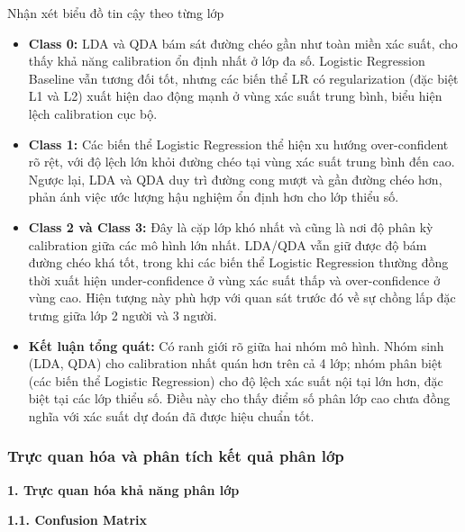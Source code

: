 \begin{warningbox}{Nhận xét biểu đồ tin cậy theo từng lớp}
\begin{itemize}
    \item \textbf{Class 0:} LDA và QDA bám sát đường chéo gần như toàn miền xác suất, cho thấy khả năng calibration ổn định nhất ở lớp đa số. Logistic Regression Baseline vẫn tương đối tốt, nhưng các biến thể LR có regularization (đặc biệt L1 và L2) xuất hiện dao động mạnh ở vùng xác suất trung bình, biểu hiện lệch calibration cục bộ.

    \item \textbf{Class 1:} Các biến thể Logistic Regression thể hiện xu hướng over-confident rõ rệt, với độ lệch lớn khỏi đường chéo tại vùng xác suất trung bình đến cao. Ngược lại, LDA và QDA duy trì đường cong mượt và gần đường chéo hơn, phản ánh việc ước lượng hậu nghiệm ổn định hơn cho lớp thiểu số.

    \item \textbf{Class 2 và Class 3:} Đây là cặp lớp khó nhất và cũng là nơi độ phân kỳ calibration giữa các mô hình lớn nhất. LDA/QDA vẫn giữ được độ bám đường chéo khá tốt, trong khi các biến thể Logistic Regression thường đồng thời xuất hiện under-confidence ở vùng xác suất thấp và over-confidence ở vùng cao. Hiện tượng này phù hợp với quan sát trước đó về sự chồng lấp đặc trưng giữa lớp 2 người và 3 người.

    \item \textbf{Kết luận tổng quát:} Có ranh giới rõ giữa hai nhóm mô hình. Nhóm sinh (LDA, QDA) cho calibration nhất quán hơn trên cả 4 lớp; nhóm phân biệt (các biến thể Logistic Regression) cho độ lệch xác suất nội tại lớn hơn, đặc biệt tại các lớp thiểu số. Điều này cho thấy điểm số phân lớp cao chưa đồng nghĩa với xác suất dự đoán đã được hiệu chuẩn tốt.
\end{itemize}
\end{warningbox}

\subsubsection{Trực quan hóa và phân tích kết quả phân lớp}

\noindent\textcolor{infocolor}{\textbf{1. Trực quan hóa khả năng phân lớp}}

\noindent\textcolor{infocolor}{\textbf{1.1. Confusion Matrix}}

